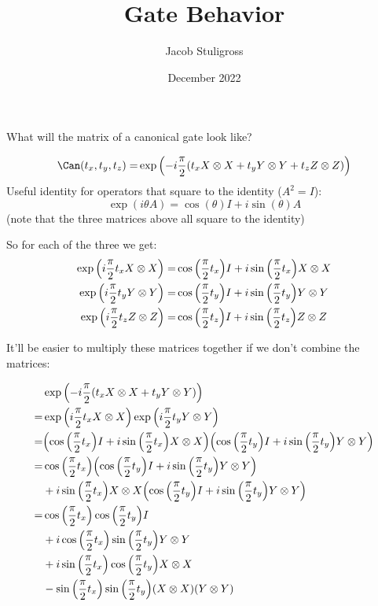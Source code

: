 \documentclass{article}
\title{Gate Behavior}
\author{Jacob Stuligross}
\date{December 2022}
\begin{document}
\maketitle

What will the matrix of a canonical gate look like?

\begin{align*}
  \Can(t_x,t_y,t_z) =& \exp\pqty{-i\frac{\pi}{2}\pqty{t_x X\otimes X + t_y Y\otimes Y + t_z Z\otimes Z}} \\
\end{align*}
Useful identity for operators that square to the identity ($A^2 = I$):
$$
\exp(i\theta A) = \cos(\theta) I + i\sin(\theta) A
$$
(note that the three matrices above all square to the identity)

So for each of the three we get:
\begin{align*}
  \exp\pqty{i\frac{\pi}{2}t_x X\otimes X} =& \cos\pqty{\frac{\pi}{2}t_x} I + i\sin\pqty{\frac{\pi}{2}t_x} X\otimes X \\
  \exp\pqty{i\frac{\pi}{2}t_y Y\otimes Y} =& \cos\pqty{\frac{\pi}{2}t_y} I + i\sin\pqty{\frac{\pi}{2}t_y} Y\otimes Y \\
  \exp\pqty{i\frac{\pi}{2}t_z Z\otimes Z} =& \cos\pqty{\frac{\pi}{2}t_z} I + i\sin\pqty{\frac{\pi}{2}t_z} Z\otimes Z \\
\end{align*}

It'll be easier to multiply these matrices together if we don't combine the matrices:

\begin{align*}
  &\exp\pqty{-i\frac{\pi}{2}\pqty{t_x X\otimes X + t_y Y\otimes Y}} \\
  =& \exp\pqty{i\frac{\pi}{2}t_x X\otimes X} \exp\pqty{i\frac{\pi}{2}t_y Y\otimes Y} \\
  =& \pqty{\cos\pqty{\frac{\pi}{2}t_x} I + i\sin\pqty{\frac{\pi}{2}t_x} X\otimes X}
  \pqty{\cos\pqty{\frac{\pi}{2}t_y} I + i\sin\pqty{\frac{\pi}{2}t_y} Y\otimes Y} \\
  =& \cos\pqty{\frac{\pi}{2}t_x}\pqty{\cos\pqty{\frac{\pi}{2}t_y} I + i\sin\pqty{\frac{\pi}{2}t_y} Y\otimes Y} 
  \\&+
  i\sin\pqty{\frac{\pi}{2}t_x} X\otimes X\pqty{\cos\pqty{\frac{\pi}{2}t_y} I + i\sin\pqty{\frac{\pi}{2}t_y} Y\otimes Y}
  \\
  =& \cos\pqty{\frac{\pi}{2}t_x}\cos\pqty{\frac{\pi}{2}t_y} I
  \\&+ i\cos\pqty{\frac{\pi}{2}t_x}\sin\pqty{\frac{\pi}{2}t_y} Y\otimes Y 
  \\&+
  i\sin\pqty{\frac{\pi}{2}t_x} \cos\pqty{\frac{\pi}{2}t_y} X\otimes X
  \\&- \sin\pqty{\frac{\pi}{2}t_x} \sin\pqty{\frac{\pi}{2}t_y} \pqty{X\otimes X}\pqty{Y\otimes Y}
  \\
\end{align*}
\end{document}
